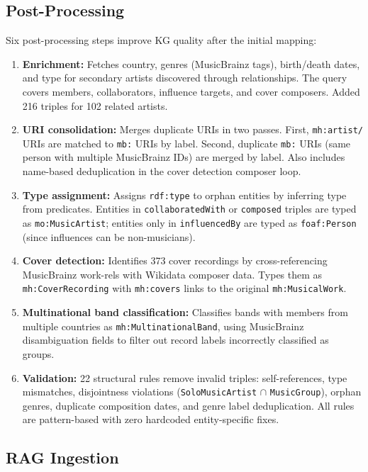 \documentclass[11pt,a4paper]{article}
\begin{document}
\subsection{Post-Processing}

Six post-processing steps improve KG quality after the initial mapping:

\begin{enumerate}[nosep]
  \item \textbf{Enrichment:} Fetches country, genres (MusicBrainz tags), birth/death dates, and type for secondary artists discovered through relationships. The query covers members, collaborators, influence targets, and cover composers. Added 216 triples for 102 related artists.
  \item \textbf{URI consolidation:} Merges duplicate URIs in two passes. First, \texttt{mh:artist/} URIs are matched to \texttt{mb:} URIs by label. Second, duplicate \texttt{mb:} URIs (same person with multiple MusicBrainz IDs) are merged by label. Also includes name-based deduplication in the cover detection composer loop.
  \item \textbf{Type assignment:} Assigns \texttt{rdf:type} to orphan entities by inferring type from predicates. Entities in \texttt{collaboratedWith} or \texttt{composed} triples are typed as \texttt{mo:MusicArtist}; entities only in \texttt{influencedBy} are typed as \texttt{foaf:Person} (since influences can be non-musicians).
  \item \textbf{Cover detection:} Identifies 373 cover recordings by cross-referencing MusicBrainz work-rels with Wikidata composer data. Types them as \texttt{mh:CoverRecording} with \texttt{mh:covers} links to the original \texttt{mh:MusicalWork}.
  \item \textbf{Multinational band classification:} Classifies bands with members from multiple countries as \texttt{mh:MultinationalBand}, using MusicBrainz disambiguation fields to filter out record labels incorrectly classified as groups.
  \item \textbf{Validation:} 22 structural rules remove invalid triples: self-references, type mismatches, disjointness violations (\texttt{SoloMusicArtist} $\cap$ \texttt{MusicGroup}), orphan genres, duplicate composition dates, and genre label deduplication. All rules are pattern-based with zero hardcoded entity-specific fixes.
\end{enumerate}

\subsection{RAG Ingestion}
\end{document}
